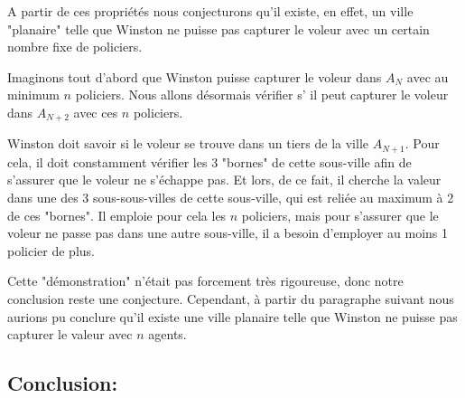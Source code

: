 \medskip

A partir de ces propriétés nous conjecturons qu'il existe, en effet, un ville "planaire" telle que Winston ne puisse pas capturer le voleur avec un certain nombre fixe de policiers.

\medskip

Imaginons tout d'abord que Winston puisse capturer le voleur dans $A_N$ avec au minimum $n$ policiers. Nous allons désormais vérifier s' il peut capturer le voleur dans $A_{N+2}$ avec ces $n$ policiers. 

\medskip 

Winston doit savoir si le voleur se trouve dans un tiers de la ville $A_{N+1}$. Pour cela, il doit constamment vérifier les 3 "bornes" de cette sous-ville afin de s'assurer que le voleur ne s'échappe pas. Et lors, de ce fait, il cherche la valeur dans une des 3 sous-sous-villes de cette sous-ville, qui est reliée au maximum à 2 de ces "bornes". Il emploie pour cela les $n$ policiers, mais pour s'assurer que le voleur ne passe pas dans une autre sous-ville, il a besoin d'employer au moins 1 policier de plus.

\medskip

Cette "démonstration" n'était pas forcement très rigoureuse, donc notre conclusion reste une conjecture. Cependant, à partir du paragraphe suivant nous aurions pu conclure qu'il existe une ville planaire telle que Winston ne puisse pas capturer le valeur avec $n$ agents.

\subsection{Conclusion:}

